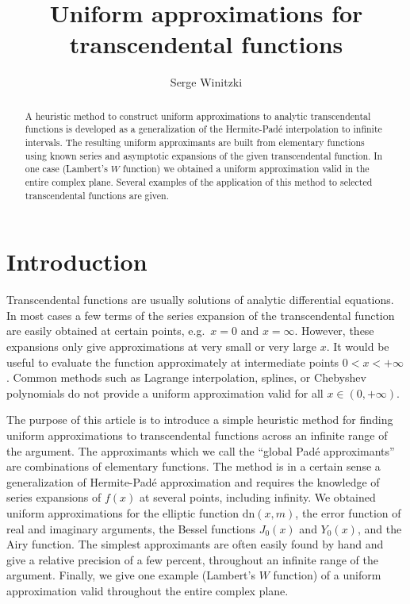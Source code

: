 \documentclass{llncs}
\begin{document}
\title{Uniform approximations for transcendental functions}

\author{Serge Winitzki}

\maketitle

\begin{abstract}
A heuristic method to construct uniform approximations to analytic transcendental
functions is developed as a generalization of the Hermite-Pad\'e interpolation
to infinite intervals. The resulting uniform approximants
are built from elementary functions using known series and asymptotic
expansions of the given transcendental function.
In one case (Lambert's $W$ function)
we obtained a uniform approximation valid in the entire complex plane.
Several examples of the application of this method to selected transcendental
functions are given.
\end{abstract}



\section{Introduction}

Transcendental functions are usually solutions of analytic differential
equations. In most cases a few terms of the series expansion of the
transcendental function are easily obtained at certain points, e.g.~$x=0$
and $x=\infty $. However, these expansions only give approximations
at very small or very large $x$. It would be useful to evaluate the
function approximately at intermediate points $0<x<+\infty $. Common
methods such as Lagrange interpolation, splines, or Chebyshev polynomials
do not provide a uniform approximation valid for all $x\in \left(0,+\infty \right)$.

The purpose of this article is to introduce a simple heuristic method
for finding uniform approximations to transcendental functions across
an infinite range of the argument. The approximants which we call
the {}``global Pad\'e approximants'' are combinations of elementary
functions. The method is in a certain sense a generalization of Hermite-Pad\'e
approximation and requires the knowledge of series expansions of $f\left(x\right)$
at several points, including infinity. We obtained uniform approximations
for the elliptic function $\textrm{dn}\left(x,m\right)$, the error
function of real and imaginary arguments, the Bessel functions $J_{0}\left(x\right)$
and $Y_{0}\left(x\right)$, and the Airy function. The simplest approximants
are often easily found by hand and give a relative precision of a
few percent, throughout an infinite range of the argument. Finally,
we give one example (Lambert's $W$ function) of a uniform approximation
valid throughout the entire complex plane.
\end{document}
